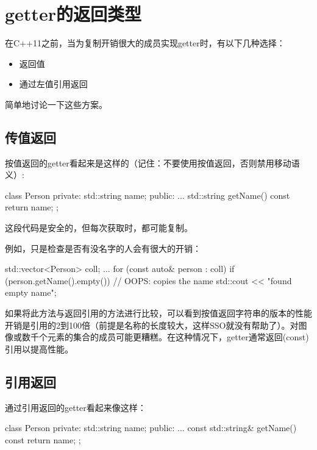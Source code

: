 \section{getter的返回类型}
在C++11之前，当为复制开销很大的成员实现getter时，有以下几种选择：

\begin{itemize}
	\item 返回值
	\item 通过左值引用返回
\end{itemize}

简单地讨论一下这些方案。

\subsection{传值返回}

按值返回的getter看起来是这样的（记住：不要使用按值返回，否则禁用移动语义）:

\begin{cppcode}
class Person
{
private:
	std::string name;
public:
	...
	std::string getName() const {
		return name;
	}
};
\end{cppcode}

这段代码是安全的，但每次获取时，都可能复制。

例如，只是检查是否有没名字的人会有很大的开销：

\begin{cppcode}
std::vector<Person> coll;
...
for (const auto& person : coll) {
	if (person.getName().empty()) { // OOPS: copies the name
		std::cout << "found empty name\n";
	}
}
\end{cppcode}

如果将此方法与返回引用的方法进行比较，可以看到按值返回字符串的版本的性能开销是引用的2到100倍（前提是名称的长度较大，这样SSO就没有帮助了）。对图像或数千个元素的集合的成员可能更糟糕。在这种情况下，getter通常返回(const)引用以提高性能。

\subsection{引用返回}

通过引用返回的getter看起来像这样：

\begin{cppcode}
class Person
{
private:
	std::string name;
public:
	...
	const std::string& getName() const {
		return name;
	}
};
\end{cppcode}

